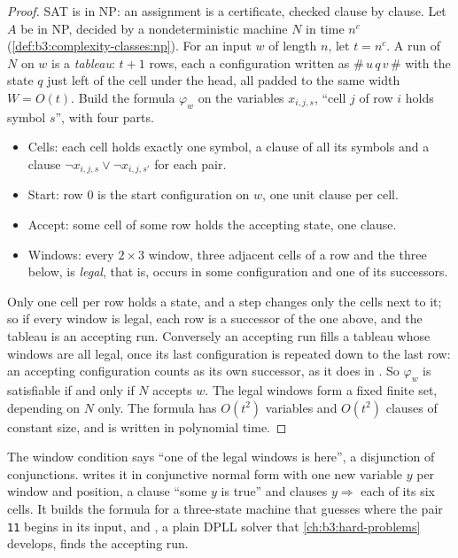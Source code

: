 \begin{proof}
SAT is in NP: an assignment is a certificate, checked clause by clause. Let $A$ be in NP, decided by a nondeterministic machine $N$ in time $n^c$ (\cref{def:b3:complexity-classes:np}). For an input $w$ of length $n$, let $t = n^c$. A run of $N$ on $w$ is a \emph{tableau}: $t + 1$ rows, each a configuration written as $\#\,u\,q\,v\,\#$ with the state $q$ just left of the cell under the head, all padded to the same width $W = O(t)$. Build the formula $\varphi_w$ on the variables $x_{i,j,s}$, ``cell $j$ of row $i$ holds symbol $s$'', with four parts.
\begin{itemize}
  \item Cells: each cell holds exactly one symbol, a clause of all its symbols and a clause $\neg x_{i,j,s} \vee \neg x_{i,j,s'}$ for each pair.
  \item Start: row 0 is the start configuration on $w$, one unit clause per cell.
  \item Accept: some cell of some row holds the accepting state, one clause.
  \item Windows: every $2 \times 3$ window, three adjacent cells of a row and the three below, is \emph{legal}, that is, occurs in some configuration and one of its successors.
\end{itemize}
Only one cell per row holds a state, and a step changes only the cells next to it; so if every window is legal, each row is a successor of the one above, and the tableau is an accepting run. Conversely an accepting run fills a tableau whose windows are all legal, once its last configuration is repeated down to the last row: an accepting configuration counts as its own successor, as it does in . So $\varphi_w$ is satisfiable if and only if $N$ accepts $w$. The legal windows form a fixed finite set, depending on $N$ only. The formula has $O(t^2)$ variables and $O(t^2)$ clauses of constant size, and is written in polynomial time.
\end{proof}

The window condition says ``one of the legal windows is here'', a disjunction of conjunctions.  writes it in conjunctive normal form with one new variable $y$ per window and position, a clause ``some $y$ is true'' and clauses $y \Rightarrow$ each of its six cells. It builds the formula for a three-state machine that guesses where the pair \texttt{11} begins in its input, and , a plain DPLL solver that \cref{ch:b3:hard-problems} develops, finds the accepting run.

